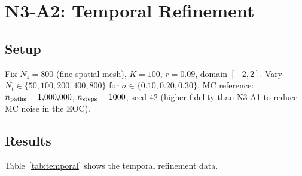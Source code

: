 \documentclass[11pt,a4paper]{article}
\newcommand{\Nz}{N_z}
\newcommand{\Nt}{N_t}
\begin{document}
\section{N3-A2: Temporal Refinement}
\label{sec:temporal}

\subsection{Setup}

Fix $\Nz = 800$ (fine spatial mesh), $K = 100$, $r = 0.09$, domain
$[-2, 2]$.  Vary $\Nt \in \{50, 100, 200, 400, 800\}$ for
$\sigma \in \{0.10, 0.20, 0.30\}$.  MC reference:
$n_{\rm paths} = 1{,}000{,}000$, $n_{\rm steps} = 1000$, seed 42
(higher fidelity than N3-A1 to reduce MC noise in the EOC).

\subsection{Results}

Table~\ref{tab:temporal} shows the temporal refinement data.
\end{document}

